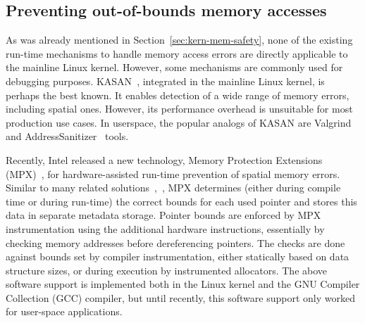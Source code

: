 \subsection{Preventing out-of-bounds memory accesses}
\label{sec:kern-mem-out-of-bounds}

As was already mentioned in Section~\ref{sec:kern-mem-safety}, none of the existing run-time mechanisms to handle memory access errors are directly applicable to the mainline Linux kernel. However, some mechanisms are commonly used for debugging purposes.
KASAN~\cite{kasan}, integrated in the mainline Linux kernel, is perhaps the best known. It enables detection of a wide range of memory errors, including spatial ones. However, its performance overhead is unsuitable for most production use cases.
In userspace, the popular analogs of KASAN are Valgrind~\cite{nethercote2007valgrind} and AddressSanitizer~\cite{serebryany2012addresssanitizer} tools. 

Recently, Intel released a new technology, \intel Memory Protection Extensions (MPX)~\cite{ramakesavan2015intel}, for hardware-assisted run-time prevention of spatial memory errors.  Similar to many related solutions~\cite{jones1997backwards},~\cite{nagarakatte2009softbound}, MPX determines (either during compile time or during run-time) the correct bounds for each used pointer and stores this data in separate metadata storage. Pointer bounds are enforced by MPX instrumentation using the additional hardware instructions, essentially by checking memory addresses before dereferencing pointers. The checks are done against bounds set by compiler instrumentation, either statically based on data structure sizes, or during execution by instrumented allocators. The above software support is implemented both in the Linux kernel and the GNU Compiler Collection (GCC) compiler, but until recently, this software support only worked for user-space applications. 
 
